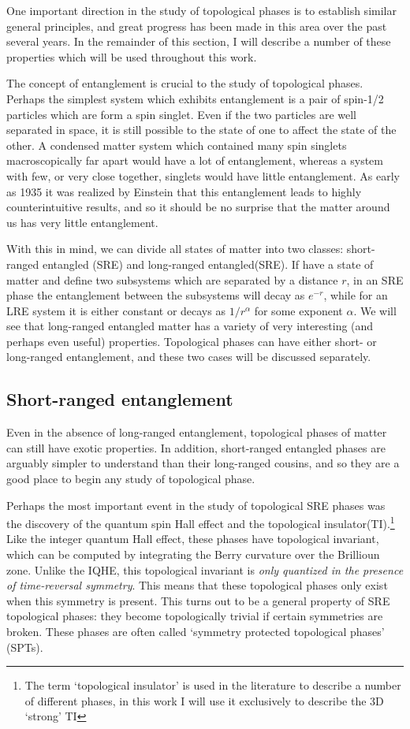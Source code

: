 One important direction in the study of topological phases is to establish similar general principles, and great progress has been made in this area over the past several years. In the remainder of this section, I will describe a number of these properties which will be used throughout this work.

The concept of entanglement is crucial to the study of topological phases. Perhaps the simplest system which exhibits entanglement is a pair of spin-1/2 particles which are form a spin singlet. Even if the two particles are well separated in space, it is still possible to the state of one to affect the state of the other. A condensed matter system which contained many spin singlets macroscopically far apart would have a lot of entanglement, whereas a system with few, or very close together, singlets would have little entanglement. As early as 1935 it was realized by Einstein\cite{EPR} that this entanglement leads to highly counterintuitive results, and so it should be no surprise that the matter around us has very little entanglement.

With this in mind, we can divide all states of matter into two classes: short-ranged entangled (SRE) and long-ranged entangled(SRE). If have a state of matter and define two subsystems which are separated by a distance $r$, in an SRE phase the entanglement between the subsystems will decay as $e^{-r}$, while for an LRE system it is either constant or decays as $1/r^{\alpha}$ for some exponent $\alpha$. We will see that long-ranged entangled matter has a variety of very interesting (and perhaps even useful) properties. Topological phases can have either short- or long-ranged entanglement, and these two cases will be discussed separately.

\subsection{Short-ranged entanglement}

Even in the absence of long-ranged entanglement, topological phases of matter can still have exotic properties. In addition, short-ranged entangled phases are arguably simpler to understand than their long-ranged cousins, and so they are a good place to begin any study of topological phase.

Perhaps the most important event in the study of topological SRE phases was the discovery of the quantum spin Hall effect\cite{spinHallReview} and the topological insulator(TI).\cite{KaneHasanRMP,QiZhangRMP}\footnote{The term `topological insulator' is used in the literature to describe a number of different phases, in this work I will use it exclusively to describe the 3D `strong' TI}
Like the integer quantum Hall effect, these phases have topological invariant, which can be computed by integrating the Berry curvature over the Brillioun zone. Unlike the IQHE, this topological invariant is \emph{only quantized in the presence of time-reversal symmetry}. This means that these topological phases only exist when this symmetry is present. This turns out to be a general property of SRE topological phases: they become topologically trivial if certain symmetries are broken. These phases are often called `symmetry protected topological phases' (SPTs).

